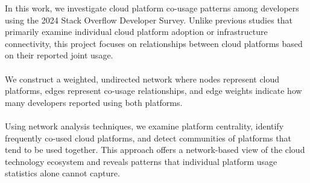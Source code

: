 \documentclass{article}
\begin{document}
\begin{itemize}
{{In this work, we investigate cloud platform co-usage patterns among developers using the 2024 Stack Overflow Developer Survey. Unlike previous studies that primarily examine individual cloud platform adoption or infrastructure connectivity, this project focuses on relationships between cloud platforms based on their reported joint usage.
\\\\
We construct a weighted, undirected network where nodes represent cloud platforms, edges represent co-usage relationships, and edge weights indicate how many developers reported using both platforms.
\\\\
Using network analysis techniques, we examine platform centrality, identify frequently co-used cloud platforms, and detect communities of platforms that tend to be used together. This approach offers a network-based view of the cloud technology ecosystem and reveals patterns that individual platform usage statistics alone cannot capture.
\\\\

}}
\end{itemize}
\end{document}
